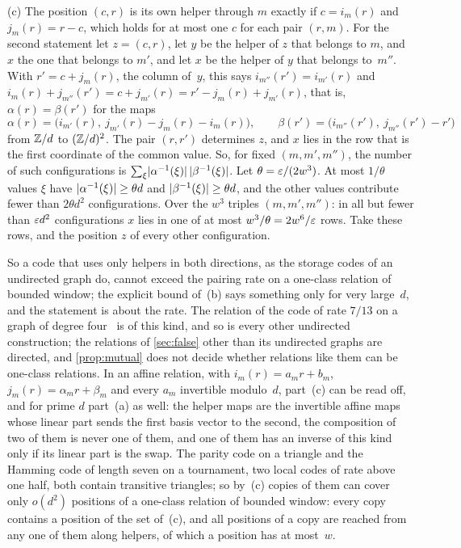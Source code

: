 \begin{informalproof}
(c) The position $(c,r)$ is its own helper through $m$ exactly if $c=i_m(r)$ and $j_m(r)=r-c$, which holds for at
most one $c$ for each pair $(r,m)$. For the second statement let $z=(c,r)$, let $y$ be the helper of $z$ that belongs
to $m$, and $x$ the one that belongs to $m'$, and let $x$ be the helper of $y$ that belongs to~$m''$. With
$r'=c+j_m(r)$, the column of~$y$, this says $i_{m''}(r')=i_{m'}(r)$ and
$i_m(r)+j_{m''}(r')=c+j_{m'}(r)=r'-j_m(r)+j_{m'}(r)$, that is, $\alpha(r)=\beta(r')$ for the maps
\[
  \alpha(r)=\bigl(i_{m'}(r),\ j_{m'}(r)-j_m(r)-i_m(r)\bigr),\qquad
  \beta(r')=\bigl(i_{m''}(r'),\ j_{m''}(r')-r'\bigr)
\]
from $\mathbb{Z}/d$ to $(\mathbb{Z}/d)^2$. The pair $(r,r')$ determines $z$, and $x$ lies in the row that is the first coordinate of
the common value. So, for fixed $(m,m',m'')$, the number of such configurations is
$\sum_\xi\lvert \alpha^{-1}(\xi) \rvert\,\lvert \beta^{-1}(\xi) \rvert$. Let $\theta=\varepsilon/(2w^3)$. At most $1/\theta$ values $\xi$
have $\lvert \alpha^{-1}(\xi) \rvert\ge\theta d$ and $\lvert \beta^{-1}(\xi) \rvert\ge\theta d$, and the other values contribute fewer than
$2\theta d^2$ configurations. Over the $w^3$ triples $(m,m',m'')$: in all but fewer than $\varepsilon d^2$ configurations $x$
lies in one of at most $w^3/\theta=2w^6/\varepsilon$ rows. Take these rows, and the position $z$ of every other
configuration.
\end{informalproof}

So a code that uses only helpers in both directions, as the storage codes of an undirected graph do, cannot exceed
the pairing rate on a one-class relation of bounded window; the explicit bound of~(b) says something only for very
large~$d$, and the statement is about the rate. The relation of the code of rate $7/13$ on a graph of
degree four~\cite[Example~7.8]{SeventhPaper2026} is of this kind, and so is every other undirected construction; the
relations of \cref{sec:false} other than its undirected graphs are directed, and \cref{prop:mutual} does not decide
whether relations like them can be one-class relations. In an affine relation, with $i_m(r)=a_mr+b_m$, $j_m(r)=\alpha_mr+\beta_m$ and every $a_m$
invertible modulo~$d$, part~(c) can be read off, and for prime $d$ part~(a) as well: the helper maps are the
invertible affine maps whose linear part sends the first basis vector to the second, the composition of two of them is never one of them, and one of them has an inverse of this kind only if its
linear part is the swap. The parity code on a triangle and the Hamming code of length seven on a tournament, two
local codes of rate above one half, both contain transitive triangles; so by~(c) copies of them can cover only
$o(d^2)$ positions of a one-class relation of bounded window: every copy contains a position of the set of~(c), and
all positions of a copy are reached from any one of them along helpers, of which a position has at most~$w$.

